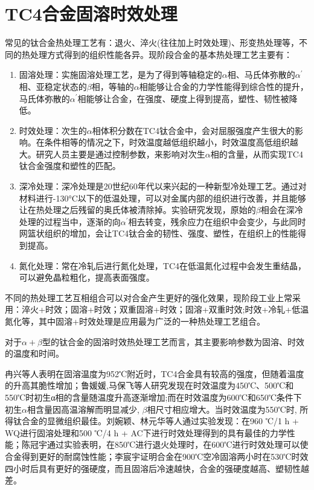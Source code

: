 \chapter{TC4合金固溶时效处理}
常见的\ti 钛合金热处理工艺有：退火、淬火(往往加上时效处理)、形变热处理等，不同的热处理方式得到的组织性能各异。现阶段\ti 合金的基本热处理工艺主要有：
\begin{enumerate}
	\item 固溶处理：实施固溶处理工艺，是为了得到等轴稳定的$\alpha $相、马氏体弥散的$ \alpha ^{\prime} $相、亚稳定状态的$\beta $相，等轴的$\alpha $相能够让合金的力学性能得到综合性的提升，马氏体弥散的$ \alpha ^{\prime} $相能够让合金，在强度、硬度上得到提高，塑性、韧性被降低\cite{gurong2002}。
	\item 时效处理：次生的$\alpha $相体积分数在TC4钛合金中，会对屈服强度产生很大的影响。在条件相等的情况之下，时效温度越低组织越小，时效温度高低组织越大。研究人员主要是通过控制参数，来影响对次生$\alpha $相的含量，从而实现TC4钛合金强度和塑性的匹配。
	\item 深冷处理：深冷处理是20世纪60年代以来兴起的一种新型冷处理工艺。通过对材料进行-130°C以下的低温处理，可以对金属内部的组织进行改善，并且能够让在热处理之后残留的奥氏体被清除掉。实验研究发现，原始的$\beta $相会在深冷处理的过程当中，逐渐的向$\alpha^{\prime} $相去转变，残余应力在组织中会变少，与此同时网篮状组织的增加，会让TC4钛合金的韧性、强度、塑性，在组织上的性能得到提高。
	\item 氮化处理：常在冷轧后进行氮化处理，TC4在低温氮化过程中会发生重结晶，可以避免晶粒粗化，提高表面强度\cite{guotanliuMicrostructureEvolutionTi2022}。
\end{enumerate}
不同的热处理工艺互相组合可以对合金产生更好的强化效果，现阶段工业上常采用\cite{zhoukaixiangJiyushenlengchulidenanjiagongcailiaoqiexiaotexingyanjiu2022}：淬火+时效；固溶+时效；双重固溶+时效；固溶+双重时效;时效+冷轧+低温氮化等，其中固溶+时效处理是应用最为广泛的一种热处理工艺组合。

对于$\alpha+\beta$型的\ti 钛合金的固溶时效热处理工艺而言，其主要影响参数为固溶、时效的温度和时间\cite{mirror1,ranxingGurongwenduduiTi6Al4VELItaihejinxianweizuzhijixingnengdeyingxiang2021}。


冉兴等人表明\cite{ranxingGurongwenduduiTi6Al4VELItaihejinxianweizuzhijixingnengdeyingxiang2021}在固溶温度为952℃附近时，TC4合金具有较高的强度，但随着温度的升高其脆性增加；鲁媛媛,马保飞等人研究发现在时效温度为450℃、500℃和550℃时初生α相的含量随温度升高逐渐增加;而在时效温度为600℃和650℃条件下初生$\alpha$相含量因高温溶解而明显减少, $\beta$相尺寸相应增大。当时效温度为550℃时, 所得钛合金的显微组织最佳\cite{luyuanyuanShixiaochuliduiTC4taihejinweiguanzuzhihelixuexingnengdeyingxiang2019}。刘婉颖、林元华等人通过实验发现：在960 ℃/1 h + WQ进行固溶处理和500 ℃/4 h + AC下进行时效处理得到的\ti 具有最佳的力学性能\cite{LiuWanYingBuTongReChuLiGongYiDuiTi6Al4VTaiHeJinWeiGuanJieGouHeLiXueXingNengYingXiangYingWen2017}；陈冠宇通过实验表明，在850℃进行退火处理时，在600℃进行时效处理可以使合金得到更好的耐腐蚀性能\cite{1200}；李宸宇证明\ti 合金在900℃空冷固溶两小时在530℃时效四小时后具有更好的强硬度，而且固溶后冷速越快，合金的强硬度越高、塑韧性越差\cite{900}。%

